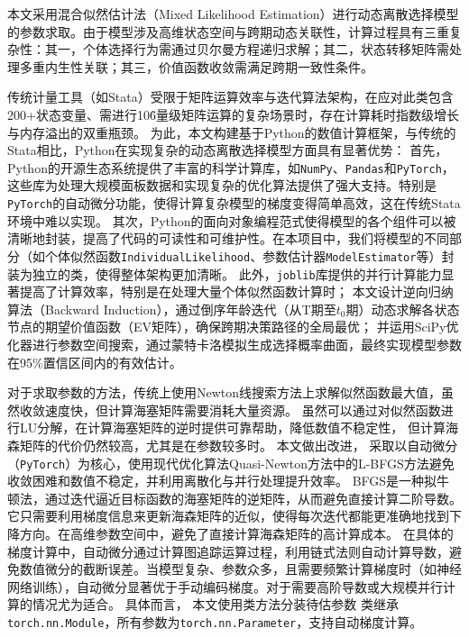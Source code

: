\documentclass[a4paper, zihao=-4, fontset = mac, oneside]{ctexbook} %
\begin{document}
本文采用混合似然估计法（Mixed Likelihood Estimation）进行动态离散选择模型的参数求取。由于模型涉及高维状态空间与跨期动态关联性，计算过程具有三重复杂性：其一，个体选择行为需通过贝尔曼方程递归求解；其二，状态转移矩阵需处理多重内生性关联；其三，价值函数收敛需满足跨期一致性条件。

传统计量工具（如Stata）受限于矩阵运算效率与迭代算法架构，在应对此类包含200+状态变量、需进行10\^6量级矩阵运算的复杂场景时，存在计算耗时指数级增长与内存溢出的双重瓶颈。
为此，本文构建基于Python的数值计算框架，与传统的Stata相比，Python在实现复杂的动态离散选择模型方面具有显著优势：
首先，Python的开源生态系统提供了丰富的科学计算库，如\lstinline{NumPy}、\lstinline{Pandas}和\lstinline{PyTorch}，这些库为处理大规模面板数据和实现复杂的优化算法提供了强大支持。特别是\lstinline{PyTorch}的自动微分功能，使得计算复杂模型的梯度变得简单高效，这在传统Stata环境中难以实现。
其次，Python的面向对象编程范式使得模型的各个组件可以被清晰地封装，提高了代码的可读性和可维护性。在本项目中，我们将模型的不同部分（如个体似然函数\lstinline{IndividualLikelihood}、参数估计器\lstinline{ModelEstimator}等）封装为独立的类，使得整体架构更加清晰。
此外，\lstinline{joblib}库提供的并行计算能力显著提高了计算效率，特别是在处理大量个体似然函数计算时；
本文设计逆向归纳算法（Backward Induction），通过倒序年龄迭代（从T期至$t_0$期）动态求解各状态节点的期望价值函数（EV矩阵），确保跨期决策路径的全局最优；
并运用SciPy优化器进行参数空间搜索，通过蒙特卡洛模拟生成选择概率曲面，最终实现模型参数在95\%置信区间内的有效估计。


对于求取参数的方法，传统上使用Newton线搜索方法上求解似然函数最大值，虽然收敛速度快，但计算海塞矩阵需要消耗大量资源。
虽然可以通过对似然函数进行LU分解，在计算海塞矩阵的逆时提供可靠帮助，降低数值不稳定性，
但计算海森矩阵的代价仍然较高，尤其是在参数较多时。
本文做出改进，
采取以自动微分（\lstinline{PyTorch}）为核心，使用现代优化算法Quasi-Newton方法中的L-BFGS方法避免收敛困难和数值不稳定，并利用离散化与并行处理提升效率。
BFGS是一种拟牛顿法，通过迭代逼近目标函数的海塞矩阵的逆矩阵，从而避免直接计算二阶导数。它只需要利用梯度信息来更新海森矩阵的近似，使得每次迭代都能更准确地找到下降方向。在高维参数空间中，避免了直接计算海森矩阵的高计算成本。
在具体的梯度计算中，自动微分通过计算图追踪运算过程，利用链式法则自动计算导数，避免数值微分的截断误差。当模型复杂、参数众多，且需要频繁计算梯度时（如神经网络训练），自动微分显著优于手动编码梯度。对于需要高阶导数或大规模并行计算的情况尤为适合。
具体而言，
本文使用类方法分装待估参数
类继承
\lstinline{torch.nn.Module}，所有参数为\lstinline{torch.nn.Parameter}，支持自动梯度计算。
\end{document}
